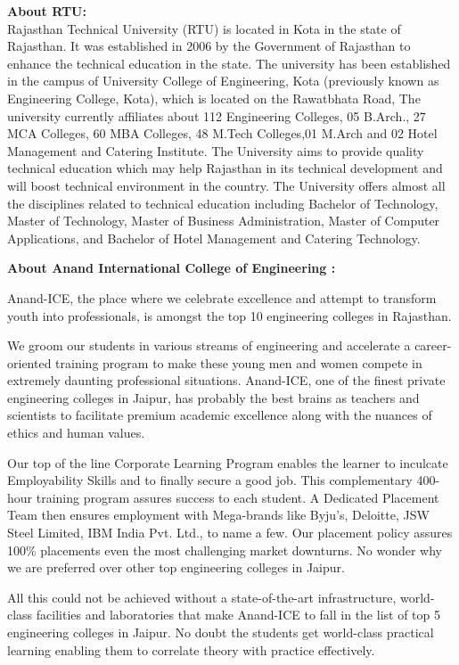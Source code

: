 \documentclass[twoside,11pt]{amsart}
\begin{document}
\vskip 10mm
\noindent
{\Large \bf About RTU: }
\\[7pt]

\noindent
Rajasthan Technical University (RTU) is located in Kota in the state of Rajasthan. It was established in 2006 by the Government of Rajasthan to enhance the technical education in the state. The university has been established in the campus of University College of Engineering, Kota (previously known as Engineering College, Kota), which is located on the Rawatbhata Road, The university currently affiliates about 112 Engineering Colleges, 05 B.Arch., 27 MCA Colleges, 60 MBA Colleges, 48 M.Tech Colleges,01 M.Arch and 02 Hotel Management and Catering Institute. The University aims to provide quality technical education which may help Rajasthan in its technical development and will boost technical environment in the country. The University offers almost all the disciplines related to technical education including Bachelor of Technology, Master of Technology, Master of Business Administration, Master of Computer Applications, and Bachelor of Hotel Management and Catering Technology.

\newpage
\noindent
{\Large \bf About Anand International College of Engineering : }
\\[7pt]
\noindent

Anand-ICE, the place where we celebrate excellence and attempt to transform youth into professionals, is amongst the top 10 engineering colleges in Rajasthan.

We groom our students in various streams of engineering and accelerate a career-oriented training program to make these young men and women compete in extremely daunting professional situations. Anand-ICE, one of the finest private engineering colleges in Jaipur, has probably the best brains as teachers and scientists to facilitate premium academic excellence along with the nuances of ethics and human values.

Our top of the line Corporate Learning Program enables the learner to inculcate Employability Skills and to finally secure a good job. This complementary 400-hour training program assures success to each student. A Dedicated Placement Team then ensures employment with Mega-brands like Byju’s, Deloitte, JSW Steel Limited, IBM India Pvt. Ltd., to name a few. Our placement policy assures 100\% placements even the most challenging market downturns. No wonder why we are preferred over other top engineering colleges in Jaipur.

All this could not be achieved without a state-of-the-art infrastructure, world-class facilities and laboratories that make Anand-ICE to fall in the list of top 5 engineering colleges in Jaipur. No doubt the students get world-class practical learning enabling them to correlate theory with practice effectively.
\end{document}
